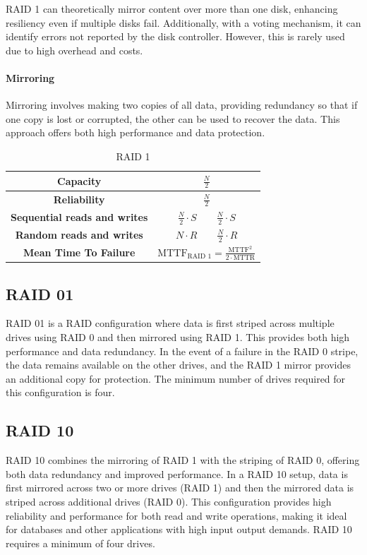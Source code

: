 RAID 1 can theoretically mirror content over more than one disk, enhancing resiliency even if multiple disks fail. 
Additionally, with a voting mechanism, it can identify errors not reported by the disk controller. 
However, this is rarely used due to high overhead and costs.

\paragraph*{Mirroring}
Mirroring involves making two copies of all data, providing redundancy so that if one copy is lost or corrupted, the other can be used to recover the data.
This approach offers both high performance and data protection.
\begin{table}[H]
    \centering
    \begin{tabular}{|cc|}
    \hline
    \textbf{Capacity}                    & $\frac{N}{2}$                                                          \\ \hline
    \textbf{Reliability}                 & $\frac{N}{2}$                                                          \\ \hline
    \textbf{Sequential reads and writes} & $\frac{N}{2}\cdot S \qquad \frac{N}{2}\cdot S$                         \\ \hline
    \textbf{Random reads and writes}     & $N\cdot R \qquad \frac{N}{2}\cdot R$                                   \\ \hline
    \textbf{Mean Time To Failure}        & $\text{MTTF}_{\text{RAID }1}=\frac{\text{MTTF}^2}{2\cdot \text{MTTR}}$ \\ \hline
    \end{tabular}
    \caption{RAID 1}
\end{table}

\subsection{RAID 01}
RAID 01 is a RAID configuration where data is first striped across multiple drives using RAID 0 and then mirrored using RAID 1.
This provides both high performance and data redundancy. 
In the event of a failure in the RAID 0 stripe, the data remains available on the other drives, and the RAID 1 mirror provides an additional copy for protection. 
The minimum number of drives required for this configuration is four.

\subsection{RAID 10}
RAID 10 combines the mirroring of RAID 1 with the striping of RAID 0, offering both data redundancy and improved performance. 
In a RAID 10 setup, data is first mirrored across two or more drives (RAID 1) and then the mirrored data is striped across additional drives (RAID 0). 
This configuration provides high reliability and performance for both read and write operations, making it ideal for databases and other applications with high input output demands. 
RAID 10 requires a minimum of four drives.
